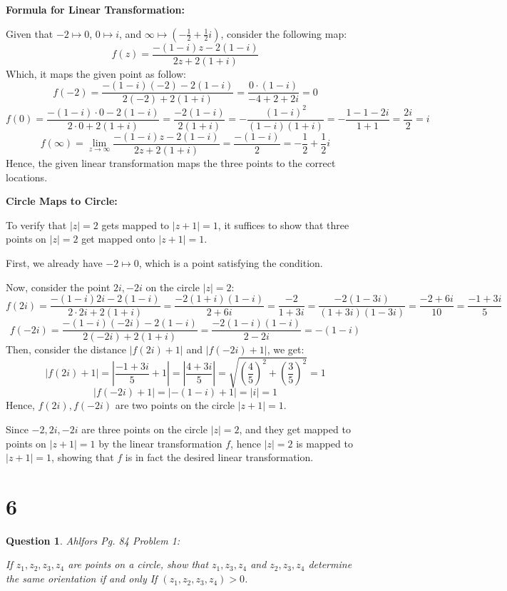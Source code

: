 \documentclass{article}
\newtheorem{question}{Question}
\begin{document}
\hfill

\textbf{Formula for Linear Transformation:}

Given that $-2\mapsto 0$, $0\mapsto i$, and $\infty\mapsto (-\frac{1}{2}+\frac{1}{2}i)$, consider the following map:
$$f(z) = \frac{-(1-i)z-2(1-i)}{2z+2(1+i)}$$
Which, it maps the given point as follow:
$$f(-2)=\frac{-(1-i)(-2)-2(1-i)}{2(-2)+2(1+i)}=\frac{0\cdot(1-i)}{-4+2+2i}=0$$
$$f(0)=\frac{-(1-i)\cdot 0-2(1-i)}{2\cdot 0+2(1+i)}=\frac{-2(1-i)}{2(1+i)}=-\frac{(1-i)^2}{(1-i)(1+i)} = -\frac{1-1-2i}{1+1}=\frac{2i}{2}=i$$
$$f(\infty)=\lim_{z\rightarrow\infty}\frac{-(1-i)z-2(1-i)}{2z+2(1+i)} = \frac{-(1-i)}{2} = -\frac{1}{2}+\frac{1}{2}i$$
Hence, the given linear transformation maps the three points to the correct locations.

\hfill

\textbf{Circle Maps to Circle:}

To verify that $|z|=2$ gets mapped to $|z+1|=1$, it suffices to show that three points on $|z|=2$ get mapped onto $|z+1|=1$.

First, we already have $-2 \mapsto 0$, which is a point satisfying the condition.

Now, consider the point $2i, -2i$ on the circle $|z|=2$:
$$f(2i)=\frac{-(1-i)2i-2(1-i)}{2\cdot 2i+2(1+i)} = \frac{-2(1+i)(1-i)}{2+6i}=\frac{-2}{1+3i}=\frac{-2(1-3i)}{(1+3i)(1-3i)}=\frac{-2+6i}{10}=\frac{-1+3i}{5}$$
$$f(-2i)=\frac{-(1-i)(-2i)-2(1-i)}{2(-2i)+2(1+i)}=\frac{-2(1-i)(1-i)}{2-2i}=-(1-i)$$
Then, consider the distance $|f(2i)+1|$ and $|f(-2i)+1|$, we get:
$$|f(2i)+1|=\left|\frac{-1+3i}{5}+1\right|=\left|\frac{4+3i}{5}\right|=\sqrt{\left(\frac{4}{5}\right)^2+\left(\frac{3}{5}\right)^2}=1$$
$$|f(-2i)+1|=|-(1-i)+1|=|i|=1$$
Hence, $f(2i),f(-2i)$ are two points on the circle $|z+1|=1$.

Since $-2,2i,-2i$ are three points on the circle $|z|=2$, and they get mapped to points on $|z+1|=1$ by the linear transformation $f$,
hence $|z|=2$ is mapped to $|z+1|=1$, showing that $f$ is in fact the desired linear transformation.

\hfill

\hfill

\section*{6}
\begin{myBox}[]{}
    \begin{question}
        Ahlfors Pg. 84 Problem 1:

        If $z_1,z_2,z_3,z_4$ are points on a circle, show that $z_1,z_3,z_4$ and $z_2,z_3,z_4$ determine the same orientation if and only If
        $(z_1,z_2,z_3,z_4)>0$.
    \end{question}
\end{myBox}
\end{document}
